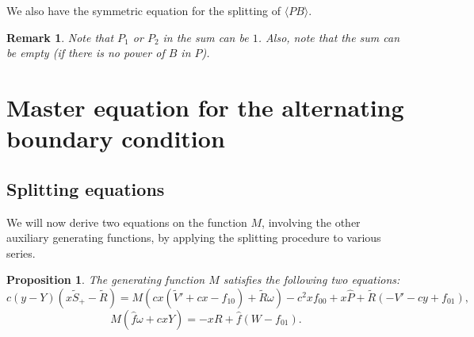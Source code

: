 \documentclass{scrartcl}
\newcommand\brak[1]{\big \langle #1 \big\rangle}
\newtheorem{prop}[thm]{Proposition}
\newtheorem{rem}{Remark}[section]
\begin{document}
We also have the symmetric equation for the splitting of $\brak{PB}$.

\begin{rem}
Note that $P_1$ or $P_2$ in the sum can be $1$. Also, note that the sum can be empty (if there is no power of $B$ in $P$).
\end{rem}

\section{Master equation for the alternating boundary condition}
\label{sec:general-master-eq}



\subsection{Splitting equations}

We will now derive two equations on the function $M$, involving the other auxiliary generating functions, by applying the splitting procedure to various series.

\begin{prop}
The generating function $M$ satisfies the following two equations:
\begin{equation}
    c(y - Y)(x\widetilde{S}_+ - \widetilde{R}) = M\left(cx(\widetilde{V}'+cx-f_{10})+\widetilde{R}\omega\right) - c^2xf_{00} + x\widehat{P} + \widetilde{R}(-V'-cy+f_{01}),
\label{eq:first-equation-in-M}
\end{equation}
\begin{equation}
    M(\widehat{f}\omega + cxY) = -xR + \widehat{f}(W-f_{01}).
    \label{eq:second-equation-in-M}
\end{equation}
\end{prop}
 
\end{document}
